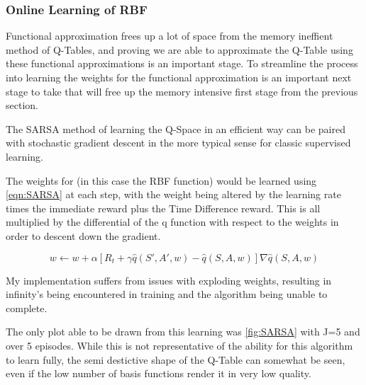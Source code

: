 \documentclass[sigconf]{acmart}
\begin{document}
\subsubsection{Online Learning of RBF}
Functional approximation frees up a lot of space from the memory ineffient method of Q-Tables, and proving we are able to approximate the Q-Table using these functional approximations is an important stage.
To streamline the process into learning the weights for the functional approximation is an important next stage to take that will free up the memory intensive first stage from the previous section.

The SARSA method of learning the Q-Space in an efficient way can be paired with stochastic gradient descent in the more typical sense for classic supervised learning. 

The weights for (in this case the RBF function) would be learned using \autoref{eqn:SARSA} at each step, with the weight being altered by the learning rate times the immediate reward plus the Time Difference reward.
This is all multiplied by the differential of the q function with respect to the weights in order to descent down the gradient.

\begin{equation} \label{eqn:SARSA}
  w \leftarrow w + \alpha[R_t +\gamma \hat{q}(S', A', w) - \hat{q}(S, A, w)]\nabla \hat{q}(S, A, w)
\end{equation}

My implementation suffers from issues with exploding weights, resulting in infinity's being encountered in training and the algorithm being unable to complete.

The only plot able to be drawn from this learning was \autoref{fig:SARSA} with J=5 and over 5 episodes. While this is not representative of the ability for this algorithm to learn fully, the semi destictive shape
of the Q-Table can somewhat be seen, even if the low number of basis functions render it in very low quality.
\end{document}
